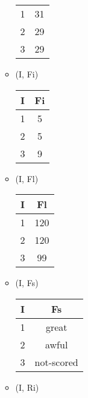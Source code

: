 \documentclass[12pt]{article}
\begin{document}
\begin{enumerate}
\begin{itemize}
\begin{center}
\begin{tabular}{c c}
                    \hline
                    1 & 31  \\
                    2 & 29  \\
                    3 & 29  \\
                    \hline
                  \end{tabular}
                \end{center}
          \item (I, Fi)
                \begin{center}
                  \begin{tabular}{c c}
                    \hline
                    I & Fi \\
                    \hline
                    1 & 5  \\
                    2 & 5  \\
                    3 & 9  \\
                    \hline
                  \end{tabular}
                \end{center}
          \item (I, Fl)
                \begin{center}
                  \begin{tabular}{c c}
                    \hline
                    I & Fl \\
                    \hline
                    1 & 120  \\
                    2 & 120  \\
                    3 & 99  \\
                    \hline
                  \end{tabular}
                \end{center}
          \item (I, Fs)
                \begin{center}
                  \begin{tabular}{c c}
                    \hline
                    I & Fs \\
                    \hline
                    1 & great  \\
                    2 & awful  \\
                    3 & not-scored  \\
                    \hline
                  \end{tabular}
                \end{center}
          \item (I, Ri)

\end{itemize}
\end{enumerate}
\end{document}
